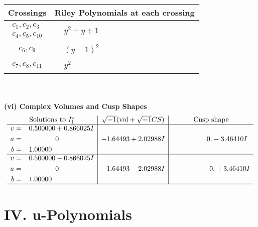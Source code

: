 \documentclass[1p]{elsarticle_modified}
\theoremstyle{definition}
\newcommand{\I}{\sqrt{-1}}
\begin{document}
\begin{tabular}{m{50pt}|m{274pt}}
Crossings & \hspace{64pt}Riley Polynomials at each crossing \\
\hline $$\begin{aligned}c_{1},c_{2},c_{3}\\c_{4},c_{5},c_{10}\end{aligned}$$&$\begin{aligned}
&y^2+y+1
\end{aligned}$\\
\hline $$\begin{aligned}c_{6},c_{9}\end{aligned}$$&$\begin{aligned}
&(y-1)^2
\end{aligned}$\\
\hline $$\begin{aligned}c_{7},c_{8},c_{11}\end{aligned}$$&$\begin{aligned}
&y^2
\end{aligned}$\\
\hline
\end{tabular}\\~\\
\newpage\flushleft \textbf{(vi) Complex Volumes and Cusp Shapes}
$$\begin{array}{c|c|c}  
\text{Solutions to }I^v_{1}& \I (\text{vol} + \sqrt{-1}CS) & \text{Cusp shape}\\
 \hline 
\begin{aligned}
v &= \phantom{-}0.500000 + 0.866025 I \\
a &= \phantom{-0.000000 } 0 \\
b &= \phantom{-}1.00000\phantom{ +0.000000I}\end{aligned}
 & -1.64493 + 2.02988 I & \phantom{-0.000000 } 0. - 3.46410 I \\ \hline\begin{aligned}
v &= \phantom{-}0.500000 - 0.866025 I \\
a &= \phantom{-0.000000 } 0 \\
b &= \phantom{-}1.00000\phantom{ +0.000000I}\end{aligned}
 & -1.64493 - 2.02988 I & \phantom{-0.000000 -}0. + 3.46410 I\\
 \hline 
 \end{array}$$\newpage
\newpage\renewcommand{\arraystretch}{1}
\centering \section*{ IV. u-Polynomials}
\end{document}
